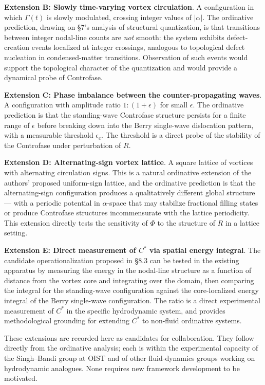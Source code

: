 \documentclass[
  11pt,
  a4paper,
]{article}
\begin{document}
\textbf{Extension B: Slowly time-varying vortex circulation}. A
configuration in which \(\Gamma(t)\) is slowly modulated, crossing
integer values of \(|\alpha|\). The ordinative prediction, drawing on
§7's analysis of structural quantization, is that transitions between
integer nodal-line counts are \emph{not} smooth: the system exhibits
defect-creation events localized at integer crossings, analogous to
topological defect nucleation in condensed-matter transitions.
Observation of such events would support the topological character of
the quantization and would provide a dynamical probe of Controfase.

\textbf{Extension C: Phase imbalance between the counter-propagating
waves}. A configuration with amplitude ratio \(1 : (1 + \epsilon)\) for
small \(\epsilon\). The ordinative prediction is that the standing-wave
Controfase structure persists for a finite range of \(\epsilon\) before
breaking down into the Berry single-wave dislocation pattern, with a
measurable threshold \(\epsilon_c\). The threshold is a direct probe of
the stability of the Controfase under perturbation of \(R\).

\textbf{Extension D: Alternating-sign vortex lattice}. A square lattice
of vortices with alternating circulation signs. This is a natural
ordinative extension of the authors' proposed uniform-sign lattice, and
the ordinative prediction is that the alternating-sign configuration
produces a qualitatively different global structure --- with a periodic
potential in \(\alpha\)-space that may stabilize fractional filling
states or produce Controfase structures incommensurate with the lattice
periodicity. This extension directly tests the sensitivity of \(\Phi\)
to the structure of \(R\) in a lattice setting.

\textbf{Extension E: Direct measurement of \(C^*\) via spatial energy
integral}. The candidate operationalization proposed in §8.3 can be
tested in the existing apparatus by measuring the energy in the
nodal-line structure as a function of distance from the vortex core and
integrating over the domain, then comparing the integral for the
standing-wave configuration against the core-localized energy integral
of the Berry single-wave configuration. The ratio is a direct
experimental measurement of \(C^*\) in the specific hydrodynamic system,
and provides methodological grounding for extending \(C^*\) to non-fluid
ordinative systems.

These extensions are recorded here as candidates for collaboration. They
follow directly from the ordinative analysis; each is within the
experimental capacity of the Singh--Bandi group at OIST and of other
fluid-dynamics groups working on hydrodynamic analogues. None requires
new framework development to be motivated.
\end{document}
